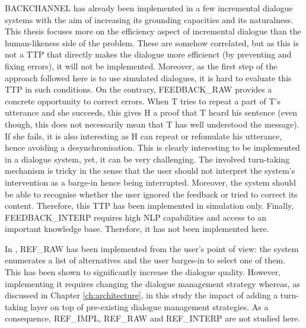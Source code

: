           BACKCHANNEL has already been implemented in a few incremental dialogue systems with the aim of increasing its grounding capacities and its naturalness. This thesis focuses more on the efficiency aspect of incremental dialogue than the human-likeness side of the problem. These are somehow correlated, but as this is not a TTP that directly makes the dialogue more efficienct (by preventing and fixing errors), it will not be implemented. Moreover, as the first step of the approach followed here is to use simulated dialogues, it is hard to evaluate this TTP in such conditions. On the contrary, FEEDBACK\_RAW provides a concrete opportunity to correct errors. When T tries to repeat a part of T's utterance and she succeeds, this gives H a proof that T heard his sentence (even though, this does not necessarily mean that T has well understood the message). If she fails, it is also interesting as H can repeat or refomulate his utterance, hence avoiding a desynchronisation. This is clearly interesting to be implemented in a dialogue system, yet, it can be very challenging. The involved turn-taking mechanism is tricky in the sense that the user should not interpret the system's intervention as a barge-in hence being interrupted. Moreover, the system should be able to recognise whether the user ignored the feedback or tried to correct its content. Therefore, this TTP has been implemented in simulation only. Finally, FEEDBACK\_INTERP requires high NLP capabilities and access to an important knowledge base. Therefore, it has not been implemented here.

          In \cite{El-Asri2014a}, REF\_RAW has been implemented from the user's point of view: the system enumerates a list of alternatives and the user barges-in to select one of them. This has been shown to significantly increase the dialogue quality. However, implementing it requires changing the dialogue management strategy whereas, as discussed in Chapter \ref{ch:architecture}, in this study the impact of adding a turn-taking layer on top of pre-existing dialogue management strategies. As a consequence, REF\_IMPL, REF\_RAW and REF\_INTERP are not studied here.

